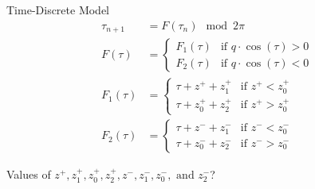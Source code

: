 \begin{frame}{Time-Discrete Model}
	\vspace{-2em}
	\begin{align*}
		\tau_{n+1} & =  F(\tau_n) \mod 2 \pi
		\\
		F(\tau)    & = \begin{cases}
			               F_1(\tau) & \text{if } q \cdot \cos(\tau) > 0 \\
			               F_2(\tau) & \text{if } q \cdot \cos(\tau) < 0
		               \end{cases}
		\\
		F_1(\tau)  & = \begin{cases}
			               \tau + z^{+} + z_{1}^{+}     & \text{if } z^{+} < z_{0}^{+} \\
			               \tau + z_{0}^{+} + z_{2}^{+} & \text{if } z^{+} > z_{0}^{+}
		               \end{cases}
		\\
		F_2(\tau)  & = \begin{cases}
			               \tau + z^{-} + z_{1}^{-}     & \text{if } z^{-} < z_{0}^{-} \\
			               \tau + z_{0}^{-} + z_{2}^{-} & \text{if } z^{-} > z_{0}^{-}
		               \end{cases}
	\end{align*}

	\vspace{1em}
	Values of $ z^{+}, z_{1}^{+}, z_{0}^{+}, z_{2}^{+}, z^{-}, z_{1}^{-}, z_{0}^{-}, \text{ and } z_{2}^{-}$?
\end{frame}

